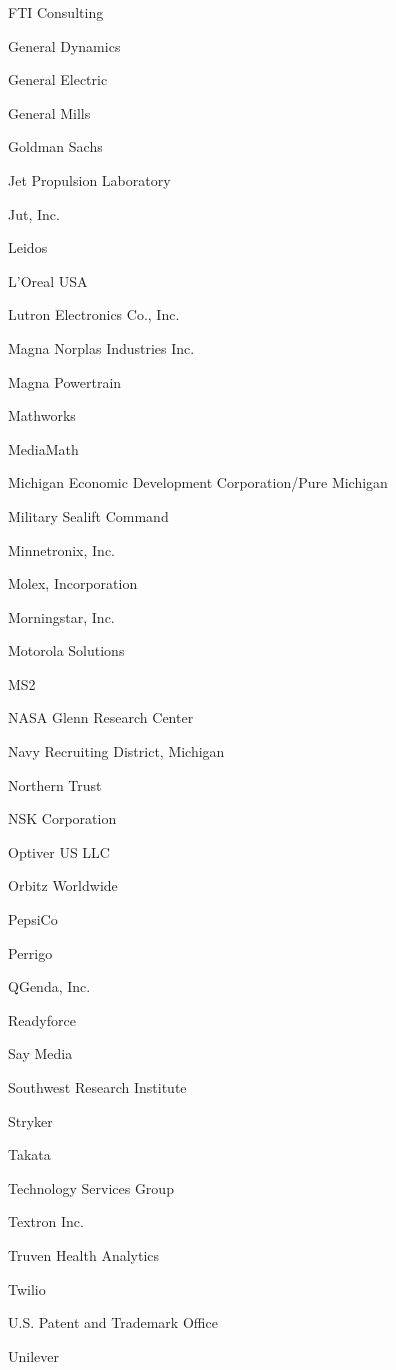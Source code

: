 \documentclass[twoside]{article}
\begin{document}
\begin{center}
\begin{multicols}{5}
\begin{FlushLeft}
\begin{compactitem}
\item FTI Consulting
\item General Dynamics
\item General Electric
\item General Mills
\item Goldman Sachs
\item Jet Propulsion Laboratory
\item Jut, Inc.
\item Leidos
\item L'Oreal USA
\item Lutron Electronics Co., Inc.
\item Magna Norplas Industries Inc.
\item Magna Powertrain
\item Mathworks
\item MediaMath
\item Michigan Economic Development Corporation/Pure Michigan
\item Military Sealift Command
\item Minnetronix, Inc.
\item Molex, Incorporation
\item Morningstar, Inc.
\item Motorola Solutions
\item MS2
\item NASA Glenn Research Center
\item Navy Recruiting District, Michigan
\item Northern Trust
\item NSK Corporation
\item Optiver US LLC
\item Orbitz Worldwide
\item PepsiCo
\item Perrigo
\item QGenda, Inc.
\item Readyforce
\item Say Media
\item Southwest Research Institute
\item Stryker
\item Takata
\item Technology Services Group
\item Textron Inc.
\item Truven Health Analytics
\item Twilio
\item U.S. Patent and Trademark Office
\item Unilever

\end{compactitem}
\end{FlushLeft}
\end{multicols}
\end{center}
\end{document}
